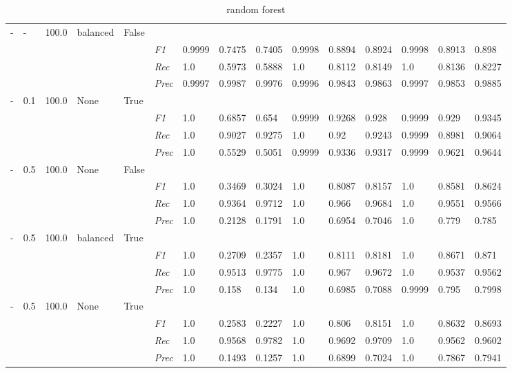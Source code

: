\begin{table}[]
\begin{tabularx}{\textwidth}{XXXXX|X|XXX|XXX|XXX}
    - & - & 100.0 & balanced & False& & & & & & & & & \\
    & & & & & \textit{F1} & 0.9999 & 0.7475 & 0.7405 & 0.9998 & 0.8894        & 0.8924        & 0.9998        & 0.8913        & 0.898        \\
    & & & & & \textit{Rec} & 1.0 & 0.5973 & 0.5888    & 1.0 & 0.8112    & 0.8149    & 1.0    & 0.8136    & 0.8227    \\
    & & & & & \textit{Prec} & 0.9997 & 0.9987 & 0.9976 & 0.9996 & 0.9843 & 0.9863 & 0.9997 & 0.9853 & 0.9885 \\ \midrule
    - & 0.1 & 100.0 & None & True& & & & & & & & & \\
    & & & & & \textit{F1} & 1.0 & 0.6857 & 0.654 & 0.9999 & 0.9268        & 0.928        & 0.9999        & 0.929        & 0.9345        \\
    & & & & & \textit{Rec} & 1.0 & 0.9027 & 0.9275    & 1.0 & 0.92    & 0.9243    & 0.9999    & 0.8981    & 0.9064    \\
    & & & & & \textit{Prec} & 1.0 & 0.5529 & 0.5051 & 0.9999 & 0.9336 & 0.9317 & 0.9999 & 0.9621 & 0.9644 \\ \midrule
    - & 0.5 & 100.0 & None & False& & & & & & & & & \\
    & & & & & \textit{F1} & 1.0 & 0.3469 & 0.3024 & 1.0 & 0.8087        & 0.8157        & 1.0        & 0.8581        & 0.8624        \\
    & & & & & \textit{Rec} & 1.0 & 0.9364 & 0.9712    & 1.0 & 0.966    & 0.9684    & 1.0    & 0.9551    & 0.9566    \\
    & & & & & \textit{Prec} & 1.0 & 0.2128 & 0.1791 & 1.0 & 0.6954 & 0.7046 & 1.0 & 0.779 & 0.785 \\ \midrule
    - & 0.5 & 100.0 & balanced & True& & & & & & & & & \\
    & & & & & \textit{F1} & 1.0 & 0.2709 & 0.2357 & 1.0 & 0.8111        & 0.8181        & 1.0        & 0.8671        & 0.871        \\
    & & & & & \textit{Rec} & 1.0 & 0.9513 & 0.9775    & 1.0 & 0.967    & 0.9672    & 1.0    & 0.9537    & 0.9562    \\
    & & & & & \textit{Prec} & 1.0 & 0.158 & 0.134 & 1.0 & 0.6985 & 0.7088 & 0.9999 & 0.795 & 0.7998 \\ \midrule
    - & 0.5 & 100.0 & None & True& & & & & & & & & \\
    & & & & & \textit{F1} & 1.0 & 0.2583 & 0.2227 & 1.0 & 0.806        & 0.8151        & 1.0        & 0.8632        & 0.8693        \\
    & & & & & \textit{Rec} & 1.0 & 0.9568 & 0.9782    & 1.0 & 0.9692    & 0.9709    & 1.0    & 0.9562    & 0.9602    \\
    & & & & & \textit{Prec} & 1.0 & 0.1493 & 0.1257 & 1.0 & 0.6899 & 0.7024 & 1.0 & 0.7867 & 0.7941 \\ \midrule
    \end{tabularx}
    \caption{random forest}
    \label{tab:all_results_random_forest}
    \end{table}
    
